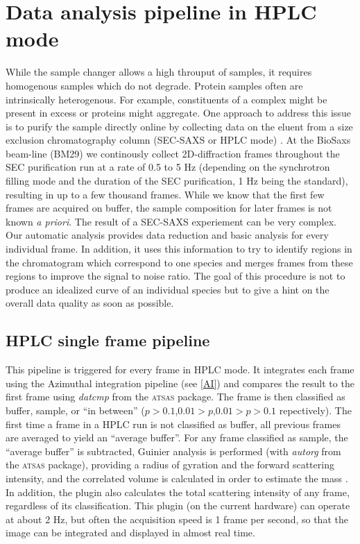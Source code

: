 \documentclass[preprint,pdf]{iucr}              %
\begin{document}
\section{Data analysis pipeline in HPLC mode}
While the sample changer allows a high throuput of samples, it requires
homogenous samples which do not degrade. 
Protein samples often are intrinsically heterogenous. 
For example, constituents of a complex might be present in excess or proteins
might aggregate.  
One approach to address this issue is to purify the sample directly online by collecting data
on the eluent from a size exclusion chromatography column (SEC-SAXS or HPLC mode) \cite{SECPaper2012,SECP12,SECSWING}.
At the BioSaxs beam-line (BM29) we continously collect 2D-diffraction frames
throughout the SEC purification run at a rate of 0.5 to 5 Hz 
(depending on the synchrotron filling mode and the duration of the SEC purification, 1 Hz being the standard), 
resulting in up to a few thousand frames. 
While we know that the first few frames are acquired on buffer, the sample composition 
for later frames is not known \textit{a priori}. 
The result of a SEC-SAXS experiement can be very complex. 
Our automatic analysis provides data reduction and basic analysis for every
individual frame. 
In addition, it uses this information to try to identify regions in the
chromatogram which correspond to one species and merges frames from these
regions to improve the signal to noise ratio.
The goal of this procedure is not to produce an idealized curve of an individual
species but to give a hint on the overall data quality as soon as possible.

\subsection{HPLC single frame pipeline}

This pipeline is triggered for every frame in HPLC mode. 
It integrates each frame using the Azimuthal integration pipeline (see \ref{AI})
and compares the result to the first frame using \textit{datcmp} from the
\textsc{atsas} package. 
The frame is then classified as buffer, sample, or ``in between'' 
($p>0.1$,$0.01 > p$,$0.01>p>0.1$ repectively). 
The first time a frame in a HPLC run is not classified as buffer, all previous
frames are averaged to yield an ``average buffer''. 
For any frame classified as sample, the ``average buffer'' is subtracted, Guinier
analysis is performed (with \textit{autorg} from the \textsc{atsas} package), 
providing a radius of gyration and the forward scattering intensity, and
the correlated volume is calculated in order to estimate the mass
\cite{RamboTainerNature2013}. 
In addition, the plugin also calculates the total scattering intensity of any
frame, regardless of its classification.
This plugin (on the current hardware) can operate at about 2 Hz, but often the acquisition speed is 1 frame per second,
so that the image can be integrated and displayed in almost real time.
\end{document}
